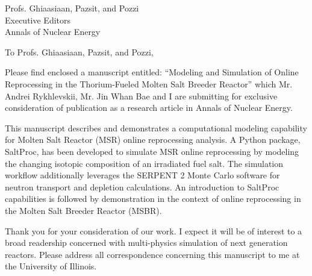 \documentclass[11pt]{letter} %
\newcommand{\RecipientName}{Profs. Ghiaasiaan, Pazsit, and Pozzi\xspace}
\newcommand{\RecipientAddress}{Executive Editors\\Annals of Nuclear Energy}
\begin{document}



\begin{letter}{\RecipientName\\
        \RecipientAddress\xspace}

\address{Kathryn D. Huff\\
kdhuff@illinois.edu\\
118 Talbot Laboratory\\
104 Wright Street\\
MC-234\\
Urbana, IL 61801}


\opening{To \RecipientName,}

Please find enclosed a manuscript entitled: ``Modeling and Simulation of Online
Reprocessing in the Thorium-Fueled Molten Salt Breeder Reactor'' which Mr. 
Andrei Rykhlevskii, Mr. Jin Whan Bae and I are submitting for exclusive consideration of 
publication as a research article in Annals of Nuclear Energy.

This manuscript describes and demonstrates a computational modeling capability
for Molten Salt Reactor (MSR) online reprocessing analysis.  A Python package,
SaltProc, has been developed to simulate MSR online reprocessing by modeling
the changing isotopic composition of an irradiated fuel salt. The simulation
workflow additionally leverages the SERPENT 2 Monte Carlo software for neutron
transport and depletion calculations. An introduction to SaltProc capabilities
is followed by demonstration in the context of online reprocessing in the
Molten Salt Breeder Reactor (MSBR).  

Thank you for your consideration of our work.  I expect it will be of interest
to a broad readership concerned with multi-physics simulation of next generation
reactors.  Please address all correspondence concerning this manuscript to me at the University of Illinois.




\end{letter}
\end{document}

